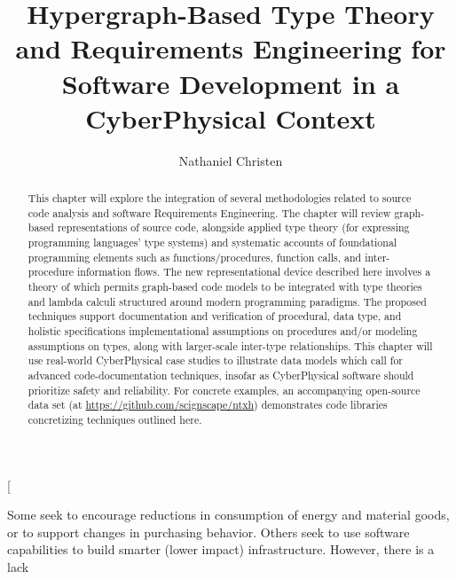 \documentclass[11pt,twocolumn]{article}
\begin{document}
\title{Hypergraph-Based Type Theory and Requirements Engineering 
for Software Development in a CyberPhysical Context}
\author[1]{Nathaniel Christen}
\twocolumn[\begin{@twocolumnfalse}
\maketitle{}
\begin{abstract}This chapter will explore the integration of several methodologies 
related to source code analysis and software Requirements 
Engineering.  The chapter will review 
graph-based representations of source code, 
alongside applied type theory (for expressing 
programming languages' type systems) and 
systematic accounts of foundational programming 
elements such as functions/procedures, function calls, and 
inter-procedure information flows.  The new 
representational device described here involves a theory 
of  which permits  
graph-based code models to be integrated with type theories 
and lambda calculi structured around modern 
programming paradigms.   
The proposed techniques support documentation and 
verification of procedural, data type, and holistic 
specifications \mdash{} implementational assumptions on procedures  
and/or modeling assumptions on types, along with 
larger-scale inter-type relationships.  
This chapter will use real-world CyberPhysical case studies 
to illustrate data models which call for advanced 
code-documentation techniques, insofar as CyberPhysical 
software should prioritize safety and reliability.    
For concrete examples, an accompanying open-source data set (at
\url{https://github.com/scignscape/ntxh}) 
demonstrates code libraries concretizing 
techniques outlined here.
\end{abstract} 
\newsavebox{\qboxii}
\begin{lrbox}{\qboxii}
\begin{frquote}Some seek to encourage reductions in consumption of energy
and  material  goods,  or  to  support  changes  in  purchasing
behavior.  Others  seek  to  use  software  capabilities  to  build
smarter (lower impact) infrastructure. However, there is a lack

\end{frquote}
\end{lrbox}
\end{@twocolumnfalse}
\end{document}
